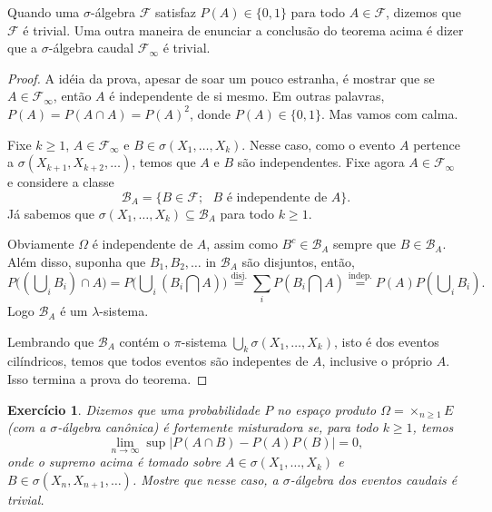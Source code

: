 \documentclass[reqno, final]{book}
\newcommand*\1{\mathds{1}}
\newtheorem{exercise}[example]{Exercício}
\DeclareMathOperator*{\mcup}{{\textstyle \bigcup}}
\DeclareMathOperator*{\mcap}{{\textstyle \bigcap}}
\begin{document}
Quando uma $\sigma$-álgebra $\mathcal{F}$ satisfaz $P(A) \in \{0,1\}$ para todo $A \in \mathcal{F}$, dizemos que $\mathcal{F}$ é trivial. 
Uma outra maneira de enunciar a conclusão do teorema acima é dizer que a $\sigma$-álgebra caudal $\mathcal{F}_\infty$ é trivial.

\begin{proof}
  A idéia da prova, apesar de soar um pouco estranha, é mostrar que se $A \in \mathcal{F}_\infty$, então $A$ é independente de si mesmo.
  Em outras palavras, $P(A) = P(A \cap A) = P(A)^2$, donde $P(A) \in \{0,1\}$.
  Mas vamos com calma.

  Fixe $k \geq 1$, $A \in \mathcal{F}_\infty$ e $B \in \sigma(X_1, \dots, X_k)$.
  Nesse caso, como o evento $A$ pertence a $\sigma(X_{k+1}, X_{k+2}, \dots)$, temos que $A$ e $B$ são independentes.
  Fixe agora $A \in \mathcal{F}_\infty$ e considere a classe
  \begin{equation}
    \mathcal{B}_A = \{B \in \mathcal{F}; \text{ $B$ é independente de $A$}\}.
  \end{equation}
  Já sabemos que $\sigma(X_1, \dots, X_k) \subseteq \mathcal{B}_A$ para todo $k \geq 1$.

  Obviamente $\Omega$ é independente de $A$, assim como $B^c \in \mathcal{B}_A$ sempre que $B \in \mathcal{B}_A$.
  Além disso, suponha que $B_1, B_2, \dots$ in $\mathcal{B}_A$ são disjuntos, então,
  \begin{equation*}
    P\big( (\mcup_i B_i) \cap A \big) = P\big( \mcup_i (B_i \mcap A) \big) \overset{\text{disj.}}= \sum_i P(B_i \mcap A) \overset{\text{indep.}}= P(A) P(\mcup_i B_i).
  \end{equation*}
  Logo $\mathcal{B}_A$ é um $\lambda$-sistema.

  Lembrando que $\mathcal{B}_A$ contém o $\pi$-sistema $\bigcup_k \sigma(X_1, \dots, X_k)$, isto é dos eventos cilíndricos, temos que todos eventos são indepentes de $A$, inclusive o próprio $A$.
  Isso termina a prova do teorema.
\end{proof}

\begin{exercise}
  Dizemos que uma probabilidade $P$ no espaço produto $\Omega = \times_{n \geq 1} E$ (com a $\sigma$-álgebra canônica) é fortemente misturadora se, para todo $k \geq 1$, temos
  \begin{equation}
    \lim_{n \to \infty} \sup \big| P(A \cap B) - P(A) P(B) \big| = 0,
  \end{equation}
  onde o supremo acima é tomado sobre $A \in \sigma(X_1, \dots, X_k)$ e $B \in \sigma(X_n, X_{n+1}, \dots)$.
  Mostre que nesse caso, a $\sigma$-álgebra dos eventos caudais é trivial.
\end{exercise}
\end{document}

